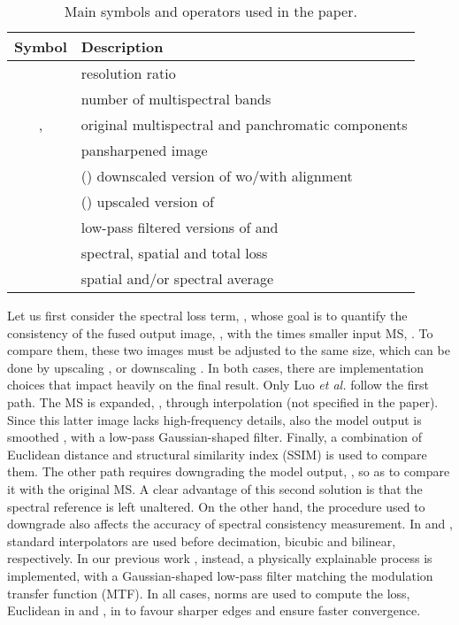 \documentclass[journal]{IEEEtran}
\begin{document}
\begin{table}[t]
\centering
\begin{tabular}{cl}
\hline
\textbf{Symbol}            & \textbf{Description}\\\hline
                        & resolution ratio \\
                        & number of multispectral bands \\
,                    & original multispectral and panchromatic components \\
                      & pansharpened image \\
      & () downscaled version of  wo/with alignment \\
                      & () upscaled version of  \\
              & low-pass filtered versions of  and  \\
  & spectral, spatial and total loss \\
    & spatial and/or spectral average \\
\hline
\end{tabular}
\caption{Main symbols and operators used in the paper.}
\label{tab:Symbols}
\end{table}

Let us first consider the spectral loss term, ,
whose goal is to quantify the consistency of the fused output image, ,
with the  times smaller input MS, .
To compare them, these two images must be adjusted to the same size,
which can be done by upscaling  \cite{Luo2020}, or downscaling  \cite{Uezato2020, Ma2020, Ciotola2022}.
In both cases, there are implementation choices that impact heavily on the final result.
Only Luo {\em et al.} \cite{Luo2020} follow the first path.
The MS is expanded, , through interpolation (not specified in the paper).
Since this latter image lacks high-frequency details, also the model output is smoothed ,
with a low-pass Gaussian-shaped filter. Finally, a combination of Euclidean distance and structural similarity index (SSIM) is used to compare them.
The other path requires downgrading the model output, , so as to compare it with the original MS.
A clear advantage of this second solution is that the spectral reference  is left unaltered.
On the other hand, the procedure used to downgrade  also affects the accuracy of spectral consistency measurement.
In \cite{Uezato2020} and \cite{Ma2020}, standard interpolators are used before decimation, bicubic and bilinear, respectively.
In our previous work \cite{Ciotola2022}, instead,
a physically explainable process is implemented, with a Gaussian-shaped low-pass filter matching the modulation transfer function (MTF).
In all cases,  norms are used to compute the loss,
Euclidean in \cite{Uezato2020} and \cite{Ma2020},
 in \cite{Ciotola2022} to favour sharper edges and ensure faster convergence.
\end{document}

